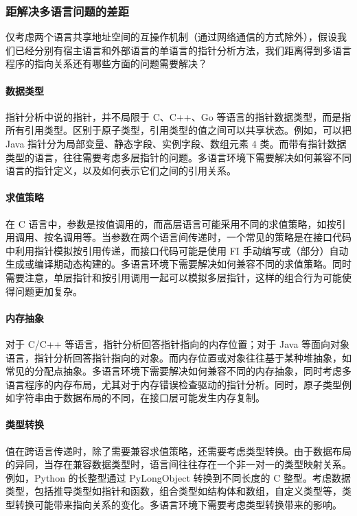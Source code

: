 \subsubsection{距解决多语言问题的差距}

仅考虑两个语言共享地址空间的互操作机制（通过网络通信的方式除外），假设我们已经分别有宿主语言和外部语言的单语言的指针分析方法，我们距离得到多语言程序的指向关系还有哪些方面的问题需要解决？

\paragraph{数据类型}
指针分析中说的指针，并不局限于 C、C++、Go 等语言的指针数据类型，而是指所有引用类型。区别于原子类型，引用类型的值之间可以共享状态。例如，可以把 Java 指针分为局部变量、静态字段、实例字段、数组元素 4 类。而带有指针数据类型的语言，往往需要考虑多层指针的问题。多语言环境下需要解决如何兼容不同语言的指针定义，以及如何表示它们之间的引用关系。

\paragraph{求值策略}
在 C 语言中，参数是按值调用的，而高层语言可能采用不同的求值策略，如按引用调用、按名调用等。当参数在两个语言间传递时，一个常见的策略是在接口代码中利用指针模拟按引用传递，而接口代码可能是使用 FI 手动编写或（部分）自动生成或编译期动态构建的。多语言环境下需要解决如何兼容不同的求值策略。同时需要注意，单层指针和按引用调用一起可以模拟多层指针，这样的组合行为可能使得问题更加复杂。

\paragraph{内存抽象}
对于 C/C++ 等语言，指针分析回答指针指向的内存位置；对于 Java 等面向对象语言，指针分析回答指针指向的对象。而内存位置或对象往往基于某种堆抽象，如常见的分配点抽象。多语言环境下需要解决如何兼容不同的内存抽象，同时考虑多语言程序的内存布局，尤其对于内存错误检查驱动的指针分析。同时，原子类型例如字符串由于数据布局的不同，在接口层可能发生内存复制。

\paragraph{类型转换}
值在跨语言传递时，除了需要兼容求值策略，还需要考虑类型转换。由于数据布局的异同，当存在兼容数据类型时，语言间往往存在一个非一对一的类型映射关系。例如，Python 的长整型通过 PyLongObject 转换到不同长度的 C 整型。考虑数据类型，包括推导类型如指针和函数，组合类型如结构体和数组，自定义类型等，类型转换可能带来指向关系的变化。多语言环境下需要考虑类型转换带来的影响。


